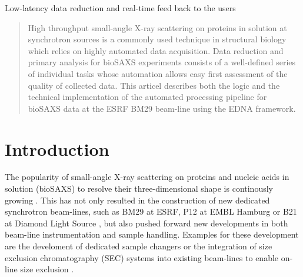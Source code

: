 \documentclass[preprint,pdf]{iucr}              %
\begin{document}
\maketitle                        %

\begin{synopsis}
Low-latency data reduction and real-time feed back to the users
\end{synopsis}

\begin{abstract}
High throughput small-angle X-ray scattering on proteins in solution at
synchrotron sources is a commonly used technique in structural biology which
relies on highly automated data acquisition.
Data reduction and primary analysis for bioSAXS experiments consists of a
well-defined series of individual tasks whose automation allows easy first
assessment of the quality of collected data.
This articel describes both the logic and the technical implementation of the
automated processing pipeline for bioSAXS data at the ESRF BM29 beam-line using
the EDNA framework.
\end{abstract}



\section{Introduction}
The popularity of small-angle X-ray scattering on proteins and nucleic acids in
solution (bioSAXS) to resolve their three-dimensional shape is continously
growing \cite{Graewert2013,Hura2009,Reyes2014}.
This has not only resulted in the construction of new dedicated
synchrotron beam-lines, such as BM29 at ESRF, P12 at EMBL Hamburg or B21 at
Diamond Light Source \cite{BM29paper,P12,B21}, but also pushed forward new
developments in both beam-line instrumentation and sample handling.
Examples for these development are the develoment of dedicated sample changers
\cite{SCPaper} or the integration of size exclusion chromatography (SEC) systems
into existing beam-lines to enable on-line size exclusion \cite{SECPaper2012}.
\end{document}
